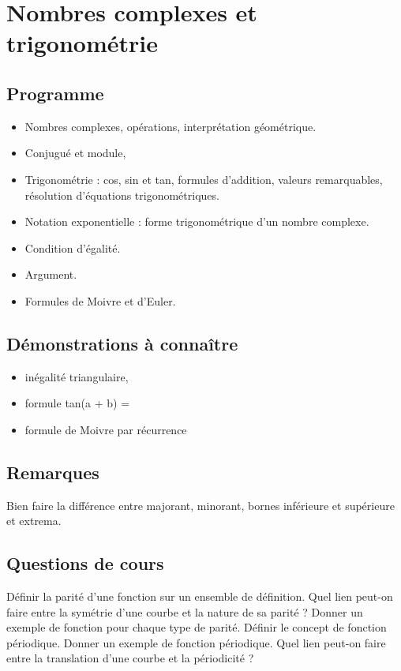  \chapter{Nombres complexes et trigonométrie}
 
\section{Programme}
	\begin{itemize}
	\item Nombres complexes, opérations, interprétation géométrique.
 	\item Conjugué et module,
 	\item Trigonométrie : cos, sin et tan, formules d’addition, valeurs remarquables, résolution d’équations trigonométriques.
 	\item Notation exponentielle : forme trigonométrique d’un nombre complexe.
 	\item  Condition d’égalité. 
 	\item Argument.
 	\item  Formules de Moivre et d’Euler.
 \end{itemize}

\section{Démonstrations à connaître}
	\begin{itemize}
		\item inégalité triangulaire,
		\item formule tan(a + b) =
		\item formule de Moivre par récurrence
\end{itemize}



\section{Remarques}

	\NB Bien faire la différence entre majorant, minorant, bornes inférieure et supérieure et extrema. 
	
	


\section{Questions de cours}	


\begin{exercise}[subtitle=Parité et périodicité, extype=cours]
	\begin{tasks} 
		\task Définir la parité d'une fonction sur un ensemble de définition.
		\task Quel lien peut-on faire entre la symétrie d'une courbe et la nature de sa parité ?
		\task Donner un exemple de fonction pour chaque type de parité.
		\task Définir le concept de fonction périodique. 
		\task Donner un exemple de fonction périodique.
		\task Quel lien peut-on faire entre la translation d'une courbe et la périodicité ?
	\end{tasks}
\end{exercise}



